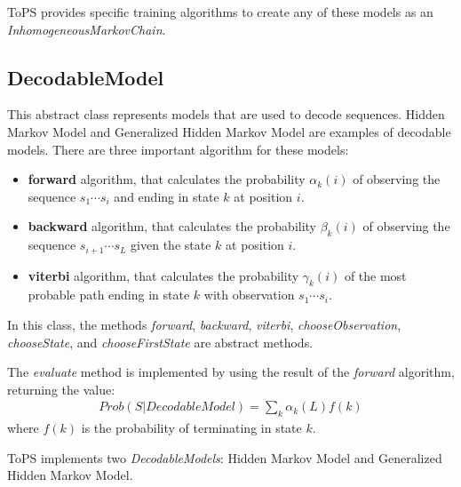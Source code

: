 ToPS provides specific training algorithms to create any of these models as an \textit{InhomogeneousMarkovChain}.

\subsection{DecodableModel}
\label{sec:decodable}

This abstract class represents  models that are used to decode sequences. Hidden Markov Model and Generalized Hidden Markov Model are examples of decodable models. There are three important algorithm for these models:

\begin{itemize}
\item \textbf{forward} algorithm, that calculates the probability $\alpha_k(i)$ of observing the sequence $s_1\cdots s_i$ and ending in state $k$ at position $i$.
\item  \textbf{backward} algorithm, that calculates the probability $\beta_k(i)$ of observing the sequence $s_{i+1}\cdots s_L$ given the state $k$ at position $i$.
\item  \textbf{viterbi} algorithm, that calculates the probability $\gamma_k(i)$ of the most probable path ending in state $k$ with observation $s_1\cdots s_i$.
\end{itemize}

In this class, the methods \textit{forward}, \textit{backward}, \textit{viterbi}, \textit{chooseObserva\-tion}, \textit{choose\-State}, and \textit{choose\-First\-State} are abstract methods.

The \textit{evaluate} method is implemented by using the result of the \textit{forward} algorithm, returning the value:
\begin{align}
Prob(S|DecodableModel) = \sum_{k} \alpha_k(L) f(k)
\end{align}
 where $f(k)$ is the probability of terminating in state $k$.


ToPS implements two  \textit{Decodable\-Models}: Hidden Markov Model and Generalized Hidden Markov Model.


